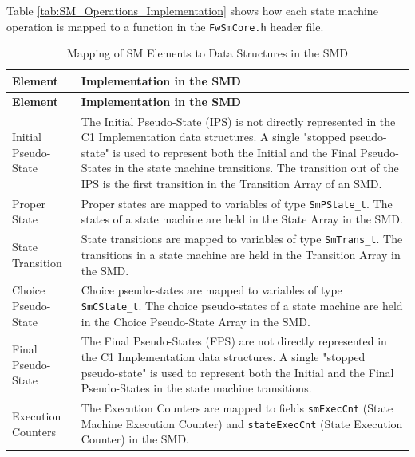 \documentclass[requirements]{../fwprofile}
\begin{document}
Table \ref{tab:SM_Operations_Implementation} shows how each state machine operation is 
mapped to a function in the \texttt{FwSmCore.h} header file.

\begin{longtable}{|>{\raggedright}p{2.7cm}|P{8.5cm}|}
\caption{Mapping of SM Elements to Data Structures in the SMD}
\label{tab:SM_Elements_Implementation}\\
\hline
{}
\textbf{Element} & \textbf{Implementation in the SMD} \\
\hline
\endfirsthead
{}
\textbf{Element} & \textbf{Implementation in the SMD} \\
\hline
\endhead
Initial Pseudo-State & The Initial Pseudo-State (IPS) is not directly represented in the C1 Implementation data structures. 
A single "stopped pseudo-state" is used to represent both the Initial and the Final Pseudo-States
in the state machine transitions.
The transition out of the IPS is the first transition in the Transition Array of an SMD.\\
\hline
Proper State & Proper states are mapped to variables of type \texttt{SmPState\_t}. 
The states of a state machine are held in the State Array in the SMD. \\
\hline
State Transition & State transitions are mapped to variables of type \texttt{SmTrans\_t}. 
The transitions in a state machine are held in the Transition Array in the SMD. \\
\hline
Choice Pseudo-State & Choice pseudo-states are mapped to variables of type \texttt{SmCState\_t}. 
The choice pseudo-states of a state machine are held in the Choice Pseudo-State Array in the SMD.\\
\hline
Final Pseudo-State & The Final Pseudo-States (FPS) are not directly represented in the C1 Implementation data structures.
A single "stopped pseudo-state" is used to represent both the Initial and the Final Pseudo-States
in the state machine transitions.\\
\hline
Execution Counters & The Execution Counters are mapped to fields \texttt{smExecCnt} 
(State Machine Execution Counter) and \texttt{stateExecCnt} (State Execution Counter) in the SMD.\\
\hline
\end{longtable}
\end{document}
